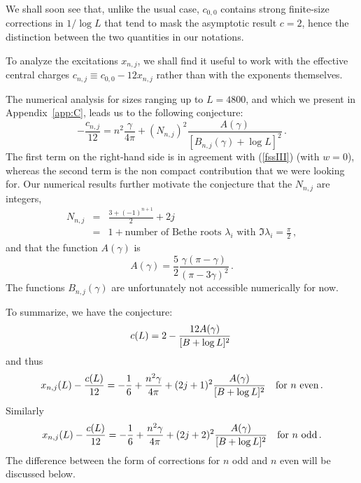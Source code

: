 \documentclass[11pt]{article}
\begin{document}
We shall soon see that, unlike the usual case, $c_{0,0}$ contains strong finite-size corrections in $1/\log L$ that tend to mask the asymptotic result $c=2$, hence the distinction between the two quantities in our notations.




To analyze the excitations $x_{n,j}$, we shall find it useful to work with the effective central charges $c_{n,j} \equiv c_{0,0}-12 x_{n,j}$ rather than
with the exponents themselves.

The numerical analysis for sizes ranging up to $L=4800$, and which we present in Appendix~\ref{app:C}, leads us to the following conjecture: 
%
\begin{equation}
-\frac{c_{n,j}}{12} = n^2\frac{\gamma}{4 \pi} + \left(N_{n,j}\right)^2 \frac{A(\gamma)}{\left[ B_{n,j}(\gamma) + \log L \right]^2}  \,. \label{c/12conj}
\end{equation}
The first term on the right-hand side is in agreement with (\ref{fssIII}) (with $w=0$), whereas the second term is the non compact contribution that we were looking for.
Our numerical results further motivate the conjecture that the $N_{n,j}$ are integers,
%
\begin{eqnarray}
 N_{n,j} &=& \frac{3 + (-1)^{n+1}}{2} + 2 j  \\
 &=& 1 + \mbox{number of Bethe roots $\lambda_i$ with $\Im \lambda_i = \frac{\pi}{2}$} \,,
\end{eqnarray}
%
and that the function $A(\gamma)$ is
%
\begin{equation}
 A(\gamma) = \frac{5}{2} \frac{\gamma \left(\pi - \gamma \right)}{ \left(\pi - 3\gamma \right)^2} \,.
\end{equation}
%
The functions $B_{n,j}(\gamma)$ are unfortunately not accessible numerically for now. 

To summarize, we have the conjecture:
%
\begin{equation}
c(L)=2-{12 A(\gamma)\over [B+\log L]^2} \,
\end{equation}
%
and thus
%
\begin{equation}
x_{n,j}(L)-{c(L)\over 12}= -\frac{1}{6} + {n^2\gamma\over 4\pi}+(2j+1)^2{A(\gamma)\over [B+\log L]^2} \quad \mbox{for $n$ even} \,.\label{xnone}
\end{equation}
%
Similarly
%
\begin{equation}
x_{n,j}(L)-{c(L)\over 12}= -\frac{1}{6} + {n^2\gamma\over 4\pi}+(2j+2)^2{A(\gamma)\over [B+\log L]^2}  \quad \mbox{for $n$ odd} \,.\label{xntwo}
\end{equation}
%
The difference between the form of corrections for $n$ odd and $n$ even will be discussed below.
\end{document}
